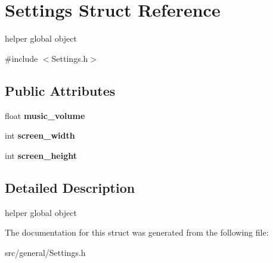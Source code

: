 \hypertarget{struct_settings}{}\section{Settings Struct Reference}
\label{struct_settings}


helper global object  




{\ttfamily \#include $<$Settings.\+h$>$}

\subsection*{Public Attributes}
\begin{DoxyCompactItemize}
\item 
\mbox{\label{struct_settings_acc122f84c20ea17487b4ec401ed7c220}} 
float {\bfseries music\+\_\+volume}
\item 
\mbox{\label{struct_settings_a0c6f7c16ec83a1583463a8ec48817c95}} 
int {\bfseries screen\+\_\+width}
\item 
\mbox{\label{struct_settings_a02a5ae32e1cab3e5db670226746aa72d}} 
int {\bfseries screen\+\_\+height}
\end{DoxyCompactItemize}


\subsection{Detailed Description}
helper global object 

The documentation for this struct was generated from the following file\+:\begin{DoxyCompactItemize}
\item 
src/general/Settings.\+h\end{DoxyCompactItemize}
